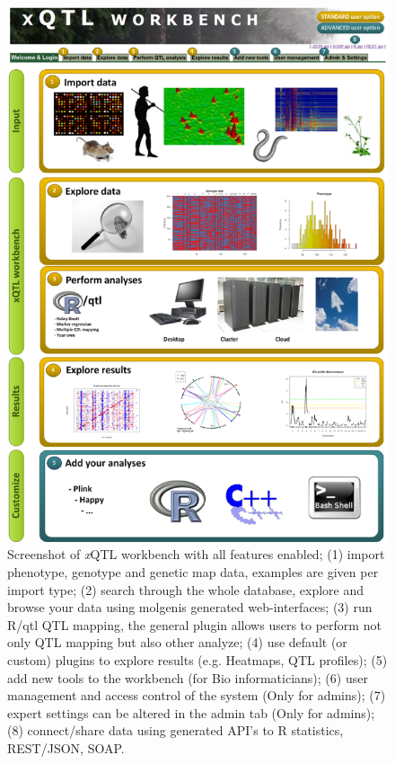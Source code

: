 \begin{figure}
	\centering
	\includegraphics[scale=0.33]{img/xqtl_overview}
	\caption[Screenshot of xQTL workbench with all features]{Screenshot of \textsl{x}QTL workbench with all features enabled; (1) import phenotype, genotype and genetic map data, examples are given per import type; (2) search through the whole database, explore and browse your data using molgenis generated web-interfaces; (3) run R/qtl QTL mapping, the general plugin allows users to perform not only QTL mapping but also other analyze; (4) use default (or custom) plugins to explore results (e.g. Heatmaps, QTL profiles); (5) add new tools to the workbench (for Bio informaticians); (6) user management and access control of the system (Only for admins); (7) expert settings can be altered in the admin tab (Only for admins); (8) connect/share data using generated API’s to R statistics, REST/JSON, SOAP.}
		\label{fig:xqtl_overview}
\end{figure}

